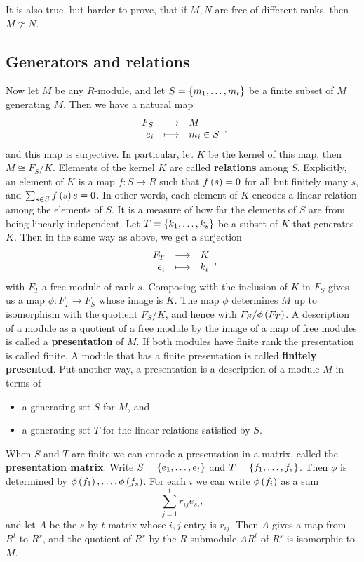 \begin{note*}
It is also true, but harder to prove, that if $ M, N $ are free of different ranks, then $ M \ncong N $.
\end{note*}

\pagebreak

\subsection{Generators and relations}


Now let $ M $ be any $ R $-module, and let $ S = \cbr{m_1, \dots, m_t} $ be a finite subset of $ M $ generating $ M $. Then we have a natural map
$$ \function{F_S}{M}{e_i}{m_i \in S}, $$
and this map is surjective. In particular, let $ K $ be the kernel of this map, then $ M \cong F_S / K $. Elements of the kernel $ K $ are called \textbf{relations} among $ S $. Explicitly, an element of $ K $ is a map $ f : S \to R $ such that $ f\br{s} = 0 $ for all but finitely many $ s $, and $ \sum_{s \in S} f\br{s}s = 0 $. In other words, each element of $ K $ encodes a linear relation among the elements of $ S $. It is a measure of how far the elements of $ S $ are from being linearly independent. Let $ T = \cbr{k_1, \dots, k_s} $ be a subset of $ K $ that generates $ K $. Then in the same way as above, we get a surjection
$$ \function{F_T}{K}{e_i}{k_i}, $$
with $ F_T $ a free module of rank $ s $. Composing with the inclusion of $ K $ in $ F_S $ gives us a map $ \phi : F_T \to F_S $ whose image is $ K $. The map $ \phi $ determines $ M $ up to isomorphism with the quotient $ F_S / K $, and hence with $ F_S / \phi\br{F_T} $. A description of a module as a quotient of a free module by the image of a map of free modules is called a \textbf{presentation} of $ M $. If both modules have finite rank the presentation is called finite. A module that has a finite presentation is called \textbf{finitely presented}. Put another way, a presentation is a description of a module $ M $ in terms of
\begin{itemize}
\item a generating set $ S $ for $ M $, and
\item a generating set $ T $ for the linear relations satisfied by $ S $.
\end{itemize}
When $ S $ and $ T $ are finite we can encode a presentation in a matrix, called the \textbf{presentation matrix}. Write $ S = \cbr{e_1, \dots, e_t} $ and $ T = \cbr{f_1, \dots, f_s} $. Then $ \phi $ is determined by $ \phi\br{f_1}, \dots, \phi\br{f_s} $. For each $ i $ we can write $ \phi\br{f_i} $ as a sum
$$ \sum_{j = 1}^t r_{ij}e_{s_j}, $$
and let $ A $ be the $ s $ by $ t $ matrix whose $ i, j $ entry is $ r_{ij} $. Then $ A $ gives a map from $ R^t $ to $ R^s $, and the quotient of $ R^s $ by the $ R $-submodule $ AR^t $ of $ R^s $ is isomorphic to $ M $.

